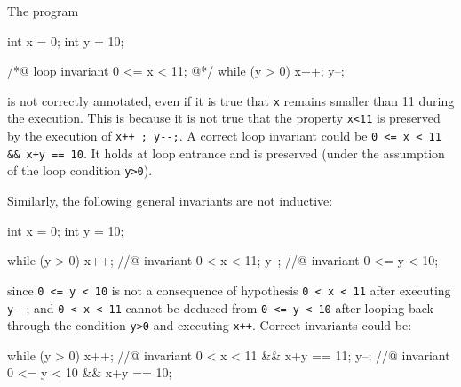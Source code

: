 The program
\begin{listing}{1}
  int x = 0;
  int y = 10;

  /*@ loop invariant 0 <= x < 11;
    @*/
  while (y > 0) {
    x++;
    y--;
  }
\end{listing}
is not correctly annotated, even if it is true that \lstinline|x|
remains smaller
than 11 during the execution. This is because it is not true that the
property \lstinline|x<11| is preserved by the execution of
\lstinline|x++ ; y--;|. A
correct loop invariant could be \lstinline|0 <= x < 11 && x+y == 10|. It holds
at loop entrance and is preserved (under the assumption of the loop
condition \lstinline|y>0|).

Similarly, the following general invariants are not inductive:
\begin{listing}{1}
  int x = 0;
  int y = 10;

  while (y > 0) {
    x++;
    //@ invariant 0 < x < 11;
    y--;
    //@ invariant 0 <= y < 10;
  }
\end{listing}
since \lstinline|0 <= y < 10| is not a consequence of
hypothesis \lstinline|0 < x < 11| after executing \verb|y--|; and
\lstinline|0 < x < 11| cannot be deduced from \lstinline|0 <= y < 10| after
looping back
through the condition \lstinline|y>0| and executing \lstinline|x++|. Correct
invariants could be:
\begin{listing}{1}
  while (y > 0) {
    x++;
    //@ invariant 0 < x < 11 && x+y == 11;
    y--;
    //@ invariant 0 <= y < 10 && x+y == 10;
  }
\end{listing}

